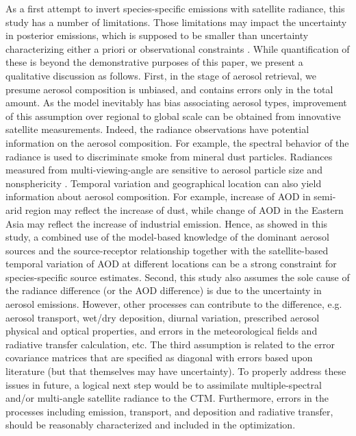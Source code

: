  As a first attempt to invert species-specific emissions with satellite
radiance, this study has a number of limitations. Those limitations may
impact the uncertainty in posterior emissions, which is supposed to be
smaller than uncertainty characterizing either a priori or observational
constraints \citep{Rodgers00}. While quantification of these is beyond
the demonstrative purposes of this paper, we present a qualitative
discussion as follows. First, in the stage of aerosol retrieval, we
presume aerosol composition is unbiased, and contains errors only in the
total amount. As the model inevitably has bias associating aerosol
types, improvement of this assumption over regional to global scale can
be obtained from innovative satellite measurements. Indeed, the radiance 
observations have potential information on the aerosol composition.
For example, the spectral behavior of the radiance is used to
discriminate smoke from mineral dust particles\citep{King99, Kaufman02}.
Radiances measured from multi-viewing-angle are sensitive to aerosol 
particle size and nonsphericity \citep{Martonchik09}.
Temporal variation and geographical location can also yield information 
about aerosol composition. For example, increase of AOD in semi-arid
region may reflect the increase of dust, while change of AOD in the
Eastern Asia may reflect the increase of industrial emission.
Hence, as showed in this study, a combined use of the model-based
knowledge of the dominant aerosol sources and the source-receptor
relationship together with the satellite-based temporal variation of AOD
at different locations can be a strong constraint for species-specific
source estimates. Second, this study also assumes the sole cause of the
radiance difference (or the AOD difference) is due to the uncertainty in
aerosol emissions. However, other processes can contribute to the
difference, e.g. aerosol transport, wet/dry deposition, diurnal
variation, prescribed aerosol physical and optical properties, and
errors in the meteorological fields and radiative transfer calculation,
etc. The third assumption is related to the error covariance matrices
that are specified as diagonal with errors based upon literature (but
that themselves may have uncertainty). To properly address these issues
in future, a logical next step would be to assimilate multiple-spectral
and/or multi-angle satellite radiance to the CTM. Furthermore, errors in
the processes including emission, transport, and deposition and
radiative transfer, should be reasonably characterized and included in
the optimization. 

